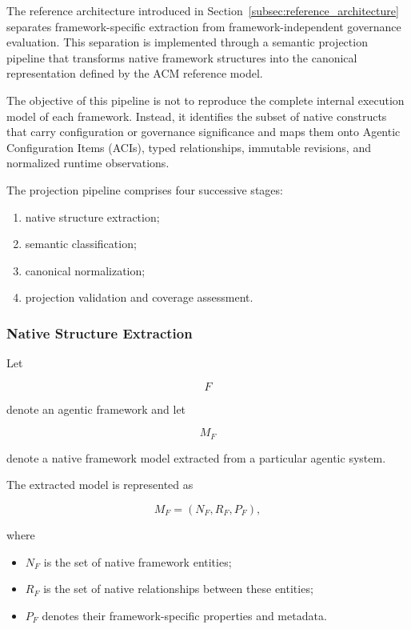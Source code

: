 \documentclass[10pt]{article}
\begin{document}
The reference architecture introduced in
Section~\ref{subsec:reference_architecture} separates framework-specific
extraction from framework-independent governance evaluation. This separation is
implemented through a semantic projection pipeline that transforms native
framework structures into the canonical representation defined by the ACM
reference model.

The objective of this pipeline is not to reproduce the complete internal
execution model of each framework. Instead, it identifies the subset of native
constructs that carry configuration or governance significance and maps them
onto Agentic Configuration Items (ACIs), typed relationships, immutable
revisions, and normalized runtime observations.

The projection pipeline comprises four successive stages:

\begin{enumerate}
    \item native structure extraction;
    \item semantic classification;
    \item canonical normalization;
    \item projection validation and coverage assessment.
\end{enumerate}

\subsubsection{Native Structure Extraction}

Let

\[
F
\]

denote an agentic framework and let

\[
M_F
\]

denote a native framework model extracted from a particular agentic system.

The extracted model is represented as

\[
M_F=(N_F,R_F,P_F),
\tag{39}
\]

where

\begin{itemize}
    \item $N_F$ is the set of native framework entities;
    \item $R_F$ is the set of native relationships between these entities;
    \item $P_F$ denotes their framework-specific properties and metadata.
\end{itemize}
\end{document}
